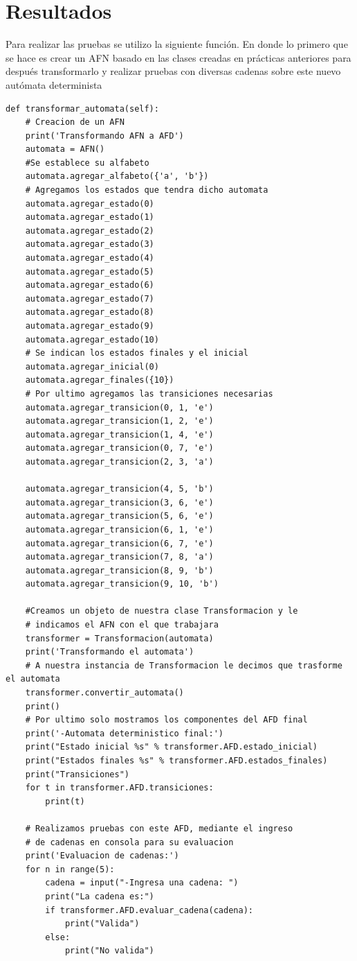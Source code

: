 \documentclass[titlepage]{article}
\begin{document}
\section{Resultados}
Para realizar las pruebas se utilizo la siguiente función. En donde lo primero que se hace es crear un AFN basado en las clases creadas en prácticas anteriores para después transformarlo y realizar pruebas con diversas cadenas sobre este nuevo autómata determinista
\begin{lstlisting}
def transformar_automata(self):
    # Creacion de un AFN
	print('Transformando AFN a AFD')
	automata = AFN()
	#Se establece su alfabeto
	automata.agregar_alfabeto({'a', 'b'})
	# Agregamos los estados que tendra dicho automata
	automata.agregar_estado(0)
	automata.agregar_estado(1)
	automata.agregar_estado(2)
	automata.agregar_estado(3)
	automata.agregar_estado(4)
	automata.agregar_estado(5)
	automata.agregar_estado(6)
	automata.agregar_estado(7)
	automata.agregar_estado(8)
	automata.agregar_estado(9)
	automata.agregar_estado(10)
	# Se indican los estados finales y el inicial
	automata.agregar_inicial(0)
	automata.agregar_finales({10})
	# Por ultimo agregamos las transiciones necesarias
	automata.agregar_transicion(0, 1, 'e')
	automata.agregar_transicion(1, 2, 'e')
	automata.agregar_transicion(1, 4, 'e')
	automata.agregar_transicion(0, 7, 'e')
	automata.agregar_transicion(2, 3, 'a')
	
	automata.agregar_transicion(4, 5, 'b')
	automata.agregar_transicion(3, 6, 'e')
	automata.agregar_transicion(5, 6, 'e')
	automata.agregar_transicion(6, 1, 'e')
	automata.agregar_transicion(6, 7, 'e')
	automata.agregar_transicion(7, 8, 'a')
	automata.agregar_transicion(8, 9, 'b')
	automata.agregar_transicion(9, 10, 'b')
	
	#Creamos un objeto de nuestra clase Transformacion y le
	# indicamos el AFN con el que trabajara
	transformer = Transformacion(automata)
	print('Transformando el automata')
	# A nuestra instancia de Transformacion le decimos que trasforme el automata
	transformer.convertir_automata()
	print()
	# Por ultimo solo mostramos los componentes del AFD final
	print('-Automata deterministico final:')
	print("Estado inicial %s" % transformer.AFD.estado_inicial)
	print("Estados finales %s" % transformer.AFD.estados_finales)
	print("Transiciones")
	for t in transformer.AFD.transiciones:
		print(t)
		
	# Realizamos pruebas con este AFD, mediante el ingreso
	# de cadenas en consola para su evaluacion
	print('Evaluacion de cadenas:')
	for n in range(5):
		cadena = input("-Ingresa una cadena: ")
		print("La cadena es:")
		if transformer.AFD.evaluar_cadena(cadena):
			print("Valida")
		else:
			print("No valida")
\end{lstlisting}
\end{document}
